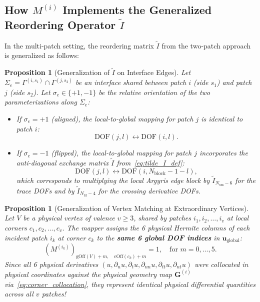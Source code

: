 \documentclass[11pt,a4paper]{article}
\newtheorem{proposition}[theorem]{Proposition}
\begin{document}
\subsection{How \texorpdfstring{$M^{(i)}$}{M(i)} Implements the Generalized Reordering Operator \texorpdfstring{$\widetilde{I}$}{I-tilde}}
In the multi-patch setting, the reordering matrix $\widetilde{I}$ from the two-patch approach is generalized as follows:

\begin{proposition}[Generalization of $\widetilde{I}$ on Interface Edges]
Let $\Sigma_e = \Gamma^{(i, s_1)} \cap \Gamma^{(j, s_2)}$ be an interface shared between patch $i$ (side $s_1$) and patch $j$ (side $s_2$). Let $\sigma_e \in \{+1, -1\}$ be the relative orientation of the two parameterizations along $\Sigma_e$:
\begin{itemize}
    \item If $\sigma_e = +1$ (aligned), the local-to-global mapping for patch $j$ is identical to patch $i$:
    \begin{equation}
        \text{DOF}(j, l) \longleftrightarrow \text{DOF}(i, l).
    \end{equation}
    \item If $\sigma_e = -1$ (flipped), the local-to-global mapping for patch $j$ incorporates the anti-diagonal exchange matrix $\widetilde{I}$ from~\eqref{eq:tilde_I_def}:
    \begin{equation}
        \text{DOF}(j, l) \longleftrightarrow \text{DOF}(i, N_{\text{block}} - 1 - l),
    \end{equation}
    which corresponds to multiplying the local Argyris edge block by $\widetilde{I}_{N_{\text{sm}}-6}$ for the trace DOFs and by $\widetilde{I}_{N_{\text{ld}}-4}$ for the crossing derivative DOFs.
\end{itemize}
\end{proposition}

\begin{proposition}[Generalization of Vertex Matching at Extraordinary Vertices]
Let $V$ be a physical vertex of valence $v \ge 3$, shared by patches $i_1, i_2, \dots, i_v$ at local corners $c_1, c_2, \dots, c_v$.
The mapper assigns the 6 physical Hermite columns of each incident patch $i_k$ at corner $c_k$ to the \textbf{same 6 global DOF indices} in $\mathbf{u}_{\text{global}}$:
\begin{equation}
    (M^{(i_k)})_{\text{gOff}(V) + m, \quad \text{cOff}(c_k) + m} = 1, \quad \text{for } m = 0, \dots, 5.
\end{equation}
Since all 6 physical derivatives $(u, \partial_n u, \partial_t u, \partial_{nn} u, \partial_{tt} u, \partial_{nt} u)$ were collocated in physical coordinates against the physical geometry map $\mathbf{G}^{(i)}$ via~\eqref{eq:corner_collocation}, they represent identical physical differential quantities across all $v$ patches!
\end{proposition}
\end{document}
